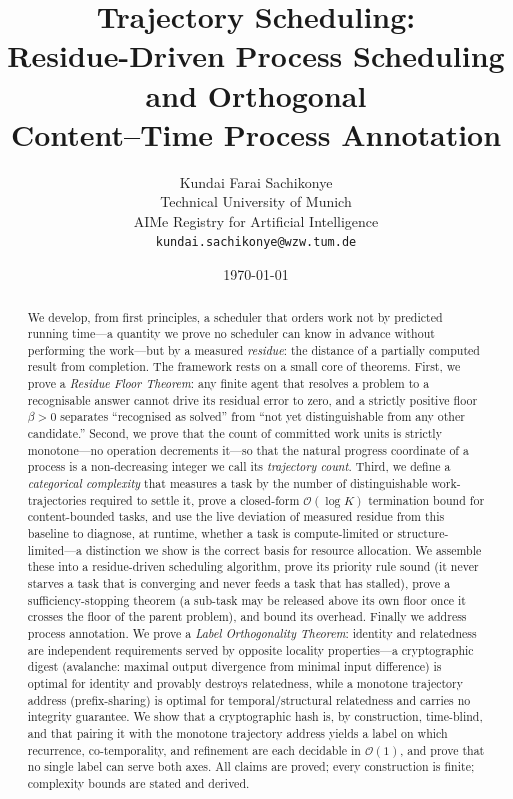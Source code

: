 \documentclass[twocolumn,10pt,a4paper]{article}
\title{\textbf{Trajectory Scheduling:\\[2pt]
Residue-Driven Process Scheduling and Orthogonal\\
Content--Time Process Annotation}}
\author{%
Kundai Farai Sachikonye\\
\small Technical University of Munich\\
\small AIMe Registry for Artificial Intelligence\\
\small \texttt{kundai.sachikonye@wzw.tum.de}}
\date{\today}
\theoremstyle{thmstyle}
\theoremstyle{definition}
\theoremstyle{remark}
\newcommand{\floor}{\beta}
\begin{document}
\maketitle

\begin{abstract}
\noindent
We develop, from first principles, a scheduler that orders work not by
predicted running time---a quantity we prove no scheduler can know in
advance without performing the work---but by a measured \emph{residue}:
the distance of a partially computed result from completion. The
framework rests on a small core of theorems. First, we prove a
\emph{Residue Floor Theorem}: any finite agent that resolves a problem
to a recognisable answer cannot drive its residual error to zero, and a
strictly positive floor $\floor>0$ separates ``recognised as solved''
from ``not yet distinguishable from any other candidate.'' Second, we
prove that the count of committed work units is strictly monotone---no
operation decrements it---so that the natural progress coordinate of a
process is a non-decreasing integer we call its \emph{trajectory count}.
Third, we define a \emph{categorical complexity} that measures a task by
the number of distinguishable work-trajectories required to settle it,
prove a closed-form $\mathcal{O}(\log K)$ termination bound for
content-bounded tasks, and use the live deviation of measured residue
from this baseline to diagnose, at runtime, whether a task is
compute-limited or structure-limited---a distinction we show is the
correct basis for resource allocation. We assemble these into a
residue-driven scheduling algorithm, prove its priority rule sound (it
never starves a task that is converging and never feeds a task that has
stalled), prove a sufficiency-stopping theorem (a sub-task may be
released above its own floor once it crosses the floor of the parent
problem), and bound its overhead. Finally we address process
annotation. We prove a \emph{Label Orthogonality Theorem}: identity and
relatedness are independent requirements served by opposite locality
properties---a cryptographic digest (avalanche: maximal output
divergence from minimal input difference) is optimal for identity and
provably destroys relatedness, while a monotone trajectory address
(prefix-sharing) is optimal for temporal/structural relatedness and
carries no integrity guarantee. We show that a cryptographic hash is, by
construction, time-blind, and that pairing it with the monotone
trajectory address yields a label on which recurrence, co-temporality,
and refinement are each decidable in $\mathcal{O}(1)$, and prove that no
single label can serve both axes. All claims are proved; every
construction is finite; complexity bounds are stated and derived.
\end{abstract}
\end{document}
